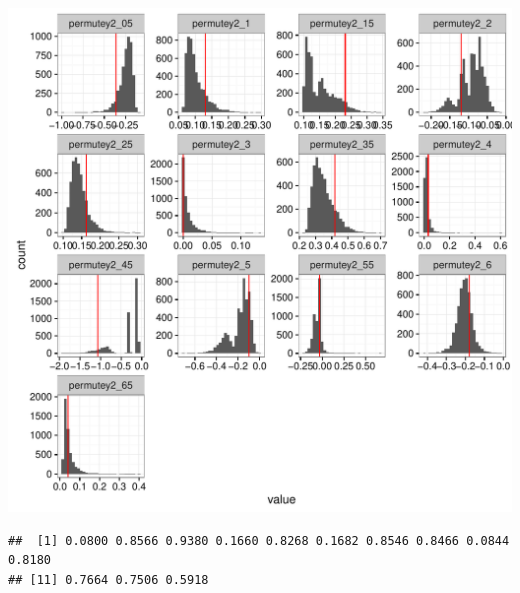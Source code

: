 \documentclass[11pt]{article}\usepackage[]{graphicx}\usepackage[]{color}
\makeatletter
\def\maxwidth{ %
  \ifdim\Gin@nat@width>\linewidth
    \linewidth
  \else
    \Gin@nat@width
  \fi
}
\newenvironment{kframe}{%
 \def\at@end@of@kframe{}%
 \ifinner\ifhmode%
  \def\at@end@of@kframe{\end{minipage}}%
  \begin{minipage}{\columnwidth}%
 \fi\fi%
 \def\FrameCommand##1{\hskip\@totalleftmargin \hskip-\fboxsep
 \colorbox{shadecolor}{##1}\hskip-\fboxsep
     \hskip-\linewidth \hskip-\@totalleftmargin \hskip\columnwidth}%
 \MakeFramed {\advance\hsize-\width
   \@totalleftmargin\z@ \linewidth\hsize
   \@setminipage}}%
 {\par\unskip\endMakeFramed%
 \at@end@of@kframe}
\newenvironment{knitrout}{}{} %
\makeatother
\begin{document}
\begin{knitrout}
\color{fgcolor}\begin{kframe}


{\ttfamily\noindent\itshape\color{messagecolor}{\#\# `stat\_bin()` using `bins = 30`. Pick better value with `binwidth`.}}\end{kframe}
\includegraphics[width=\maxwidth]{figure/t15-1} 
\begin{kframe}\begin{verbatim}
##  [1] 0.0800 0.8566 0.9380 0.1660 0.8268 0.1682 0.8546 0.8466 0.0844 0.8180
## [11] 0.7664 0.7506 0.5918
\end{verbatim}
\end{kframe}
\end{knitrout}
\end{document}
